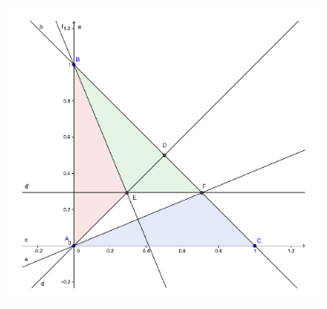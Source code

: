 \documentclass{article}
\begin{document}
\begin{center}
\includegraphics[width=0.7\textwidth]{Construction.pdf}
\end{center}
\end{document}
